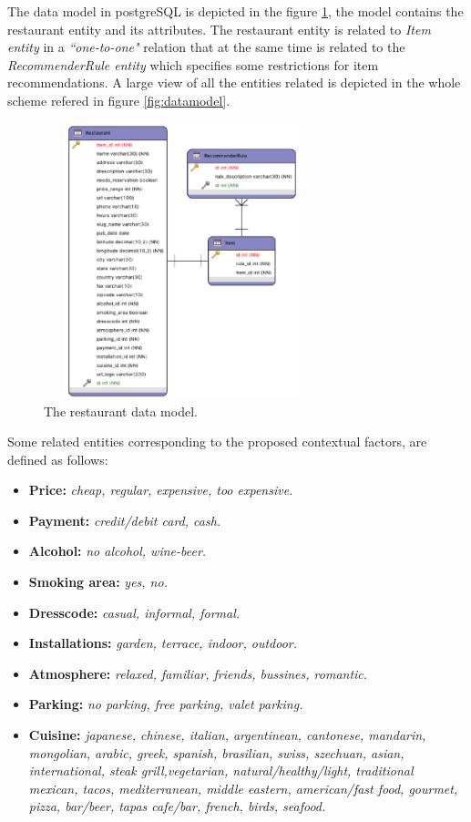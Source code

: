 The data model in postgreSQL is depicted in the figure
\ref{fig:restaurantmodeldata}, the model contains the restaurant
entity and its attributes. The restaurant entity is related to
\textit{Item entity} in a \textit{``one-to-one"} relation that at the
same time is related to the \textit{RecommenderRule entity} which
specifies some restrictions for item recommendations. A large view of
all the entities related is depicted in the whole scheme refered in
figure \ref{fig:datamodel}.
\begin{figure}
\captionsetup{justification=centering,margin=2cm,font=footnotesize}
\centering
\includegraphics[width=8cm,height=8cm,keepaspectratio]{img/data-resmodel.png}
\caption{The restaurant data model.}
\label{fig:restaurantmodeldata}     
\end{figure}
Some related entities corresponding to the proposed contextual factors, 
are defined as follows: 
\begin{itemize}
\item \textbf{Price:} \textit{cheap, regular, expensive, too expensive.}
\item \textbf{Payment:} \textit{credit/debit card, cash.}
\item \textbf{Alcohol:} \textit{no alcohol, wine-beer.}
\item \textbf{Smoking area:} \textit{yes, no.}
\item \textbf{Dresscode:} \textit{casual, informal, formal.}
\item \textbf{Installations:} \textit{garden, terrace, indoor, outdoor.}
\item \textbf{Atmosphere:} \textit{relaxed, familiar, friends, bussines, romantic.}
\item \textbf{Parking:} \textit{no parking, free parking, valet parking.}
\item \textbf{Cuisine:} \textit{japanese, chinese, italian, argentinean,
cantonese, mandarin, mongolian, arabic, greek, spanish, brasilian,
swiss, szechuan, asian, international, steak grill,vegetarian,
natural/healthy/light, traditional mexican, tacos, mediterranean,
middle eastern, american/fast food, gourmet, pizza, bar/beer, tapas
cafe/bar, french, birds, seafood.}
\end{itemize}
